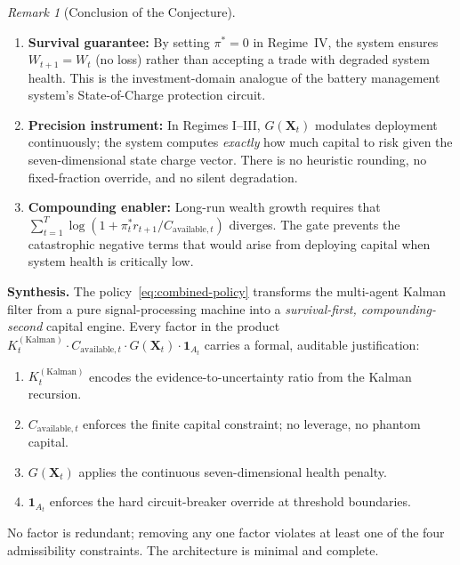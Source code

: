 \documentclass[12pt,openany]{book}
\numberwithin{equation}{chapter}
\theoremstyle{plain}
\theoremstyle{definition}
\theoremstyle{remark}
\newtheorem{remark}[theorem]{Remark}
\def\mathcal#1{#1}%
\begin{document}
\begin{remark}[Conclusion of the Conjecture]
\begin{enumerate}
  \item \textbf{Survival guarantee:}
        By setting $\pi^* = 0$ in Regime~IV, the system
        ensures $W_{t+1} = W_t$ (no loss) rather than
        accepting a trade with degraded system health.
        This is the investment-domain analogue of the
        battery management system's State-of-Charge
        protection circuit.

  \item \textbf{Precision instrument:}
        In Regimes I--III, $G(\mathbf{X}_t)$ modulates
        deployment continuously; the system computes
        \emph{exactly} how much capital to risk given
        the seven-dimensional state charge vector.
        There is no heuristic rounding, no fixed-fraction
        override, and no silent degradation.

  \item \textbf{Compounding enabler:}
        Long-run wealth growth requires that
        $\sum_{t=1}^T \log(1 + \pi_t^* r_{t+1} /
        C_{\mathrm{available},t})$ diverges.
        The gate prevents the catastrophic negative
        terms that would arise from deploying capital
        when system health is critically low.
\end{enumerate}

\medskip
\noindent\textbf{Synthesis.}
The policy~\eqref{eq:combined-policy} transforms the
multi-agent Kalman filter from a pure signal-processing
machine into a \emph{survival-first, compounding-second}
capital engine.  Every factor in the product
$K_t^{(\mathrm{Kalman})} \cdot C_{\mathrm{available},t}
\cdot G(\mathbf{X}_t) \cdot \mathbf{1}_{\mathcal{A}_t}$
carries a formal, auditable justification:
\begin{enumerate}
  \item $K_t^{(\mathrm{Kalman})}$ encodes the
        evidence-to-uncertainty ratio from the Kalman
        recursion.
  \item $C_{\mathrm{available},t}$ enforces the finite
        capital constraint; no leverage, no phantom capital.
  \item $G(\mathbf{X}_t)$ applies the continuous
        seven-dimensional health penalty.
  \item $\mathbf{1}_{\mathcal{A}_t}$ enforces the
        hard circuit-breaker override at threshold
        boundaries.
\end{enumerate}
No factor is redundant; removing any one factor
violates at least one of the four admissibility
constraints.  The architecture is minimal and complete.
\end{remark}
\end{document}
